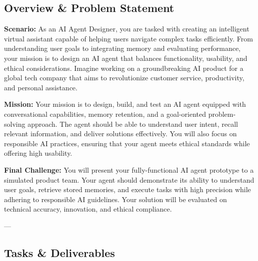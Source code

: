 \documentclass[10pt,a4paper]{article}
\begin{document}
\subsection*{Overview \& Problem Statement}

\textbf{Scenario:}  
As an AI Agent Designer, you are tasked with creating an intelligent virtual assistant capable of helping users navigate complex tasks efficiently. From understanding user goals to integrating memory and evaluating performance, your mission is to design an AI agent that balances functionality, usability, and ethical considerations. Imagine working on a groundbreaking AI product for a global tech company that aims to revolutionize customer service, productivity, and personal assistance.

\textbf{Mission:}  
Your mission is to design, build, and test an AI agent equipped with conversational capabilities, memory retention, and a goal-oriented problem-solving approach. The agent should be able to understand user intent, recall relevant information, and deliver solutions effectively. You will also focus on responsible AI practices, ensuring that your agent meets ethical standards while offering high usability.

\textbf{Final Challenge:}  
You will present your fully-functional AI agent prototype to a simulated product team. Your agent should demonstrate its ability to understand user goals, retrieve stored memories, and execute tasks with high precision while adhering to responsible AI guidelines. Your solution will be evaluated on technical accuracy, innovation, and ethical compliance.

---

\subsection*{Tasks \& Deliverables}
\end{document}
